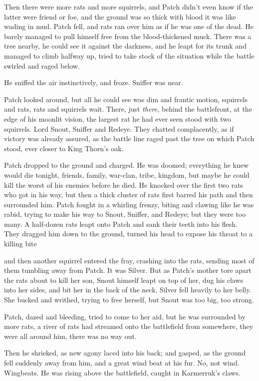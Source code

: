 \documentclass[11pt]{article}
\begin{document}
Then there were more rats and more squirrels, and Patch didn't even know if the latter were friend or foe, and the ground was so thick with blood it was like wading in mud. Patch fell, and rats ran over him as if he was one of the dead. He barely managed to pull himself free from the blood-thickened muck. There was a tree nearby, he could see it against the darkness, and he leapt for its trunk and managed to climb halfway up, tried to take stock of the situation while the battle swirled and raged below.\par
He sniffed the air instinctively, and froze. Sniffer was near.\par
 Patch looked around, but all he could see was dim and frantic motion, squirrels and rats, rats and squirrels %
 wait. There, just {\it there,} behind the battlefront, at the edge of his moonlit vision, the largest rat he had ever seen stood with two squirrels. Lord Snout, Sniffer and Redeye. They chatted complacently, as if victory was already assured, as the battle line raged past the tree on which Patch stood, ever closer to King Thorn's oak.\par
 Patch dropped to the ground and charged. He was doomed; everything he knew would die tonight, friends, family, war-clan, tribe, kingdom, but maybe he could kill the worst of his enemies before he died. He knocked over the first two rats who got in his way, but then a thick cluster of rats first barred his path and then surrounded him. Patch fought in a whirling frenzy, biting and clawing like he was rabid, trying to make his way to Snout, Sniffer, and Redeye; but they were too many. A half-dozen rats leapt onto Patch and sank their teeth into his flesh. They dragged him down to the ground, turned his head to expose his throat to a killing bite %
\par
 and then another squirrel entered the fray, crashing into the rats, sending most of them tumbling away from Patch. It was Silver. But as Patch's mother tore apart the rats about to kill her son, Snout himself leapt on top of her, dug his claws into her sides, and bit her in the back of the neck. Silver fell heavily to her belly. She bucked and writhed, trying to free herself, but Snout was too big, too strong.\par
Patch, dazed and bleeding, tried to come to her aid, but he was surrounded by more rats, a river of rats had streamed onto the battlefield from somewhere, they were all around him, there was no way out.\par
 Then he shrieked, as new agony laced into his back; and gasped, as the ground fell suddenly away from him, and a great wind beat at his fur. No, not wind. Wingbeats. He was rising above the battlefield, caught in Karmerruk's claws.\par
\end{document}
